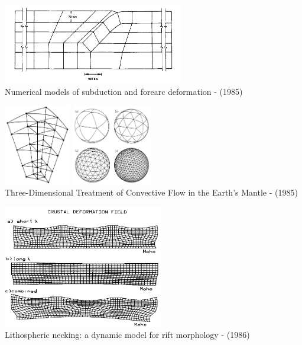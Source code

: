 \begin{center}
\includegraphics[height=3.5cm]{images/history/thar85}\\
{\captionfont Numerical models of subduction and forearc deformation - \textcite{thar85} (1985)}
\end{center}

\begin{center}
\begin{minipage}{0.48\textwidth}
\centering
\includegraphics[height=3.5cm]{images/history/baum85a}
\includegraphics[height=3.5cm]{images/history/baum85b}\\
{\captionfont Three-Dimensional Treatment of Convective Flow in the Earth's Mantle -
\textcite{baum85} (1985)}
\end{minipage}\hfill
\begin{minipage}{0.45\textwidth}
\centering
\includegraphics[width=7cm]{images/history/zupf86}\\
{\captionfont Lithospheric necking: a dynamic model for rift morphology - \textcite{zupf86} (1986)}
\end{minipage}
\end{center}


